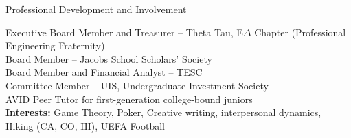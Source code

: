 \documentclass{resume} %
\begin{document}
\begin{rSection}{\faUsers{ }}{Professional Development and Involvement} 

Executive Board Member and Treasurer -- Theta Tau, E$\Delta$ Chapter (Professional Engineering Fraternity)
\\Board Member -- Jacobs School Scholars' Society 
\\Board Member and Financial Analyst -- TESC
\\Committee Member -- UIS, Undergraduate Investment Society
\\ AVID Peer Tutor for first-generation college-bound juniors
\\ \textbf{Interests: }Game Theory, Poker, Creative writing, interpersonal dynamics, Hiking (CA, CO, HI), UEFA Football
\end{rSection}


\end{document}
